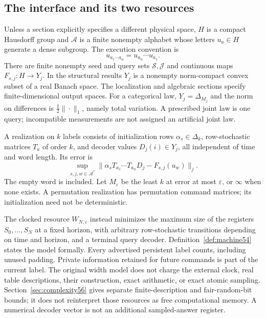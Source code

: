 \subsection{The interface and its two resources}
Unless a section explicitly specifies a different physical space, $H$ is a compact Hausdorff group and $\mathcal A$ is a finite nonempty alphabet whose letters $u_a\in H$ generate a dense subgroup. The execution convention is
\[
                  u_{a_1\cdots a_n}=u_{a_n}\cdots u_{a_1}.
\]
There are finite nonempty seed and query sets $\mathcal S,\mathcal J$ and continuous maps $F_{s,j}:H\to Y_j$. In the structural results $Y_j$ is a nonempty norm-compact convex subset of a real Banach space. The localization and algebraic sections specify finite-dimensional output spaces. For a categorical law, $Y_j=\Delta_{M_j}$ and the norm on differences is $\frac12\|\cdot\|_1$, namely total variation. A prescribed joint law is one query; incompatible measurements are not assigned an artificial joint law.

\begin{definition}\label{def:stationary55}
A realization on $k$ labels consists of initialization rows $\alpha_s\in\Delta_k$, row-stochastic matrices $T_a$ of order $k$, and decoder values $D_j(i)\in Y_j$, all independent of time and word length. Its error is
\[
       \sup_{s,j,w\in\mathcal A^*}
        \|\alpha_sT_{a_1}\cdots T_{a_n}D_j-F_{s,j}(u_w)\|_j.
\]
The empty word is included. Let $M_\varepsilon$ be the least $k$ at error at most $\varepsilon$, or $\infty$ when none exists. A permutation realization has permutation command matrices; its initialization need not be deterministic.
\end{definition}
The clocked resource $W_{N,\varepsilon}$ instead minimizes the maximum size of the registers $S_0,\ldots,S_N$ at a fixed horizon, with arbitrary row-stochastic transitions depending on time and horizon, and a terminal query decoder. Definition~\ref{def:machine54} states the model formally. Every advertised persistent label counts, including unused padding. Private information retained for future commands is part of the current label. The original width model does not charge the external clock, real table descriptions, their construction, exact arithmetic, or exact atomic sampling. Section~\ref{sec:complexity56} gives separate finite-description and fair-random-bit bounds; it does not reinterpret those resources as free computational memory. A numerical decoder vector is not an additional sampled-answer register.

